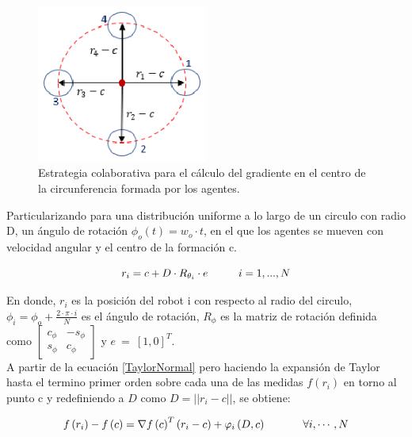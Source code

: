 \begin{figure}[htb]
\centering
\includegraphics[width=0.5\textwidth]{figures/p3.eps}
\caption{Estrategia colaborativa para el cálculo del gradiente en el centro de la circunferencia formada por los agentes.} \label{Estrategia_Colaborativa}
\end{figure}

Particularizando para una distribución uniforme a lo largo de un circulo con radio D, un ángulo de rotación $\phi_o\left(t\right)=w_o\cdot{t}$, en el que los agentes se mueven con velocidad angular  y el centro de la formación c. 

\begin{equation*}
	r_i = c + D\cdot{R}_{\theta_i}\cdot{e}\hspace{10mm}{i = 1,...,N}
\end{equation*}

En donde, $r_{i}$ es la posición del robot i con respecto al radio del circulo, ${\phi }_{i}=\phi_{o}+\frac{2\cdot\pi\cdot{i}}{N}$ es el ángulo de rotación, $R_{\phi }$ es la matriz de rotación definida como $\left[ \begin{array}{cc} {c}_{\phi } & -{s}_{\phi } \\  {s}_{\phi } & {c}_{\phi } \end{array} \right]$ y  $e\ =\ {\left[1,0\right]}^T$.\\


A partir de la ecuación \ref{TaylorNormal} pero haciendo la expansión de Taylor hasta el termino primer orden sobre cada una de las medidas $f\left(r_i\right)$ en torno al punto c y redefiniendo a $D$ como $D=||r_i-c||$, se obtiene:

\begin{equation} \label{PuntoPartidaGradiente}
	f\left(r_i\right)-f\left(c\right)=\nabla{f\left(c\right)}^T\left(r_i-c\right)+\varphi_i\left(D,c\right)\hspace{12mm}\forall{i},\cdots,N
\end{equation}

